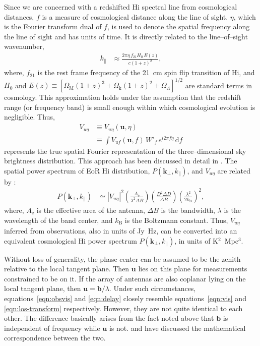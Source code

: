 \documentclass[preprint2,iop,numberedappendix]{emulateapj}
\newcommand{\dif}{\mathrm{d}}
\begin{document}
Since we are concerned with a redshifted H{\sc i} spectral line from cosmological distances, $f$ is a measure of cosmological distance along the line of sight. $\eta$, which is the Fourier transform dual of $f$, is used to denote the spatial frequency along the line of sight and has units of time. It is directly related to the line--of--sight wavenumber, 
\begin{align}\label{eqn:k-prll}
  k_\parallel &\approx \frac{2\pi\eta\,f_{21}H_0\,E(z)}{c(1+z)^2}, 
\end{align}
where, $f_{21}$ is the rest frame frequency of the 21~cm spin flip transition of H{\sc i}, and $H_0$ and $E(z)\equiv [\Omega_\textrm{M}(1+z)^3+\Omega_\textrm{k}(1+z)^2+\Omega_\Lambda]^{1/2}$ are standard terms in cosmology. This approximation holds under the assumption that the redshift range (or frequency band) is small enough within which cosmological evolution is negligible. Thus,
\begin{align}\label{eqn:los-transform}
  V_{u\eta} &\equiv V_{u\eta}(\boldsymbol{u},\eta) \nonumber\\
  &\equiv \int V_{uf}(\boldsymbol{u},f)\,W'_f\,e^{i2\pi f\eta}\,\dif f
\end{align}
represents the true spatial Fourier representation of the three--dimensional sky brightness distribution. This approach has been discussed in detail in \citet{mor04}. The spatial power spectrum of EoR H{\sc i} distribution, $P(\boldsymbol{k}_\perp,k_\parallel)$, and $V_{u\eta}$ are related by \citep{mor04,mcq06,par12a}: 
\begin{align}\label{eqn:true-power_spectrum}
  P(\boldsymbol{k}_\perp,k_\parallel) &\simeq |V_{u\eta}|^2\left(\frac{A_\textrm{e}}{\lambda^2\Delta B}\right)\left(\frac{D^2\Delta D}{\Delta B}\right)\left(\frac{\lambda^2}{2k_\textrm{B}}\right)^2,
\end{align}
where, $A_\textrm{e}$ is the effective area of the antenna, $\Delta B$ is the bandwidth, $\lambda$ is the wavelength of the band center, and $k_\textrm{B}$ is the Boltzmann constant. Thus, $V_{u\eta}$ inferred from observations, also in units of Jy~Hz, can be converted into an equivalent cosmological H{\sc i} power spectrum $P(\boldsymbol{k}_\perp,k_\parallel)$, in units of K$^2$~Mpc$^3$.

Without loss of generality, the phase center can be assumed to be the zenith relative to the local tangent plane. Then $\boldsymbol{u}$ lies on this plane for measurements constrained to be on it. If the array of antennas are also coplanar lying on the local tangent plane, then $\boldsymbol{u}=\boldsymbol{b}/\lambda$. Under such circumstances, equations~\ref{eqn:obsvis} and \ref{eqn:delay} closely resemble equations~\ref{eqn:vis} and \ref{eqn:los-transform} respectively. However, they are not quite identical to each other. The difference basically arises from the fact noted above that $\boldsymbol{b}$ is independent of frequency while $\boldsymbol{u}$ is not. \citet{par12b} and \citet{liu14a} have discussed the mathematical correspondence between the two. 
\end{document}
